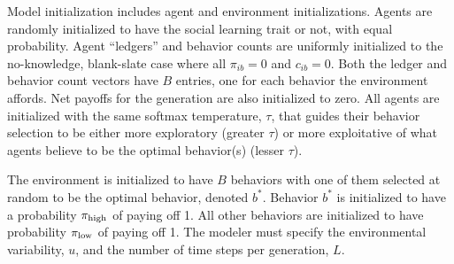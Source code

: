 \documentclass[letterpaper,11.5pt]{scrartcl}
\begin{document}
Model initialization includes agent and environment initializations. Agents are
randomly initialized to have the social learning trait or not, with equal 
probability. Agent ``ledgers'' and behavior counts 
are uniformly initialized to the no-knowledge,
blank-slate case where all $\pi_{ib} = 0$ and $c_{ib} = 0$. Both the 
ledger and behavior count vectors have $B$ entries, one for each
behavior the environment affords. Net payoffs for
the generation are also initialized to zero. All agents are initialized with
the same softmax temperature, $\tau$, that guides their behavior selection 
to be either more exploratory (greater $\tau$) or more exploitative of
what agents believe to be the optimal behavior(s) (lesser $\tau$).

The environment is initialized to have $B$ behaviors with one of them selected
at random to be the optimal behavior, denoted $b^*$. Behavior $b^*$ is 
initialized to have a probability $\pi_{\mathrm{high}}$ of paying off 1. All other behaviors
are initialized to have probability $\pi_{\mathrm{low}}$ of paying off 1. The modeler must
specify the environmental variability, $u$, and the number of time steps per 
generation, $L$. 
\end{document}

